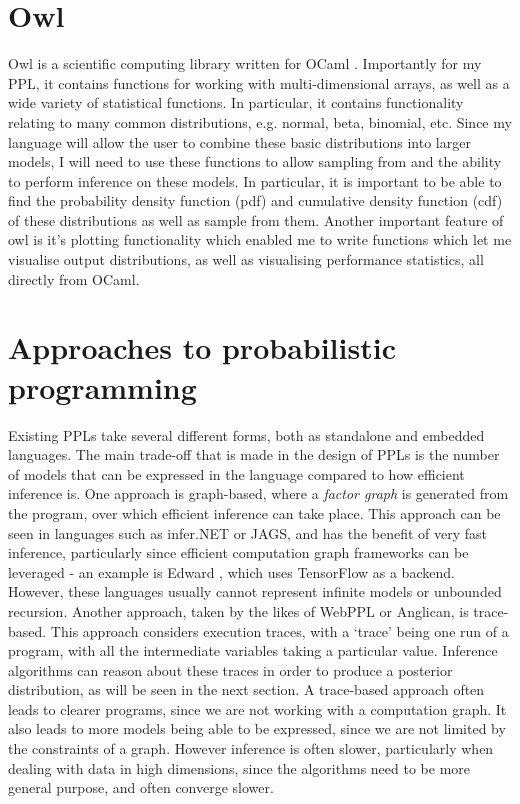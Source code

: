 \section{Owl}

Owl is a scientific computing library written for OCaml \cite{owl}. Importantly for my PPL, it contains functions for working with multi-dimensional arrays, as well as a wide variety of statistical functions. In particular, it contains functionality relating to many common distributions, e.g. normal, beta, binomial, etc. Since my language will allow the user to combine these basic distributions into larger models, I will need to use these functions to allow sampling from and the ability to perform inference on these models. In particular, it is important to be able to find the probability density function (pdf) and cumulative density function (cdf) of these distributions as well as sample from them. Another important feature of owl is it's plotting functionality which enabled me to write functions which let me visualise output distributions, as well as visualising performance statistics, all directly from OCaml.

\section{Approaches to probabilistic programming}
Existing PPLs take several different forms, both as standalone and embedded languages. The main trade-off that is made in the design of PPLs is the number of models that can be expressed in the language compared to how efficient inference is. One approach is graph-based, where a \textit{factor graph} is generated from the program, over which efficient inference can take place. This approach can be seen in languages such as infer.NET or JAGS, and has the benefit of very fast inference, particularly since efficient computation graph frameworks can be leveraged - an example is Edward \cite{edward}, which uses TensorFlow as a backend. However, these languages usually cannot represent infinite models or unbounded recursion. Another approach, taken by the likes of WebPPL or Anglican, is trace-based. This approach considers execution traces, with a `trace' being one run of a program, with all the intermediate variables taking a particular value. Inference algorithms can reason about these traces in order to produce a posterior distribution, as will be seen in the next section. A trace-based approach often leads to clearer programs, since we are not working with a computation graph. It also leads to more models being able to be expressed, since we are not limited by the constraints of a graph. However inference is often slower, particularly when dealing with data in high dimensions, since the algorithms need to be more general purpose, and often converge slower.


